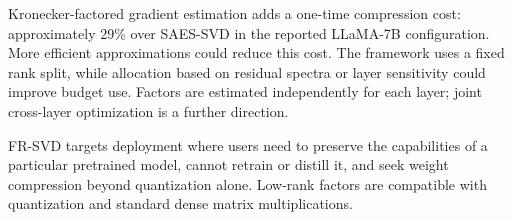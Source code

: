\documentclass[11pt]{article}
\begin{document}
Kronecker-factored gradient estimation adds a one-time compression cost: approximately 29\% over SAES-SVD in the reported LLaMA-7B configuration. More efficient approximations could reduce this cost. The framework uses a fixed rank split, while allocation based on residual spectra or layer sensitivity could improve budget use. Factors are estimated independently for each layer; joint cross-layer optimization is a further direction.

FR-SVD targets deployment where users need to preserve the capabilities of a particular pretrained model, cannot retrain or distill it, and seek weight compression beyond quantization alone. Low-rank factors are compatible with quantization and standard dense matrix multiplications.


\clearpage
\appendix

\end{document}
